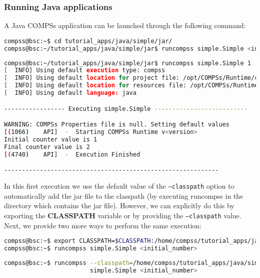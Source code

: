 \subsubsection{Running Java applications}
A Java COMPSs application can be launched through the following command:
\begin{lstlisting}[language=bash]
compss@bsc:~$ cd tutorial_apps/java/simple/jar/
compss@bsc:~/tutorial_apps/java/simple/jar$ runcompss simple.Simple <initial_number>
\end{lstlisting}

\begin{lstlisting}[language=bash]
compss@bsc:~/tutorial_apps/java/simple/jar$ runcompss simple.Simple 1
[  INFO] Using default execution type: compss
[  INFO] Using default location for project file: /opt/COMPSs/Runtime/configuration/xml/projects/default_project.xml
[  INFO] Using default location for resources file: /opt/COMPSs/Runtime/configuration/xml/resources/default_resources.xml
[  INFO] Using default language: java

----------------- Executing simple.Simple --------------------------

WARNING: COMPSs Properties file is null. Setting default values
[(1066)    API]  -  Starting COMPSs Runtime v<version>
Initial counter value is 1
Final counter value is 2
[(4740)    API]  -  Execution Finished

------------------------------------------------------------
\end{lstlisting}

In this first execution we use the default value of the \texttt{--classpath} option to automatically add the jar
file to the classpath (by executing runcompss in the directory which contains the jar file). However,
we can explicitly do this by exporting the \textbf{CLASSPATH} variable or by providing the 
\texttt{--classpath} value. Next, we provide two more ways to perform the same execution:

\begin{lstlisting}[language=bash]
compss@bsc:~$ export CLASSPATH=$CLASSPATH:/home/compss/tutorial_apps/java/simple/jar/simple.jar
compss@bsc:~$ runcompss simple.Simple <initial_number>
\end{lstlisting}

\begin{lstlisting}[language=bash]
compss@bsc:~$ runcompss --classpath=/home/compss/tutorial_apps/java/simple/jar/simple.jar 
                        simple.Simple <initial_number>
\end{lstlisting}


